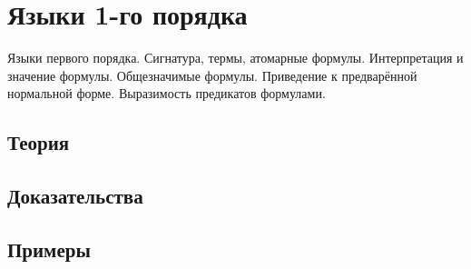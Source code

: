 
\section{Языки 1-го порядка}
\label{sec:2.3a.04-first-order-logic}

\begin{ticket}
Языки первого порядка. Сигнатура, термы, атомарные формулы. Интерпретация и значение формулы. Общезначимые формулы. Приведение к предварённой нормальной форме. Выразимость предикатов формулами.
\end{ticket}

\subsection*{Теория}

\subsection*{Доказательства}

\subsection*{Примеры}
